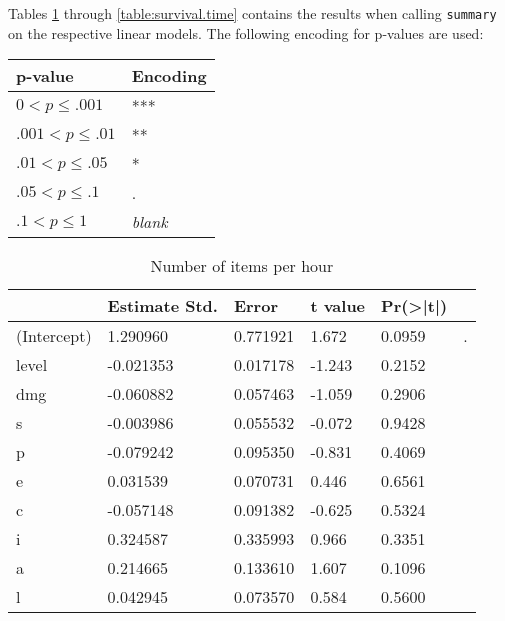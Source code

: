 Tables \ref{table:n.items} through  \ref{table:survival.time} contains the results when calling \texttt{summary} on the respective linear models. The following encoding for p-values are used:

\begin{tabular}{l|l}
\textbf{p-value}&\textbf{Encoding}\\
\hline
$0<p\leq.001$	& ***\\
$.001<p\leq.01$	& **\\
$.01<p\leq.05$	& *\\
$.05<p\leq.1$	& .\\
$.1<p\leq1$		& \textit{blank}\\


\end{tabular}

\begin{table}
\caption{Number of items per hour}
\label{table:n.items}
\begin{tabular}{l|lllll}
&Estimate Std.&Error&t value&Pr(>|t|) &\\ 
\hline
(Intercept)&1.290960 &0.771921 &1.672&0.0959&.\\
level&-0.021353  & 0.017178 & -1.243 &  0.2152&  \\
dmg&-0.060882  & 0.057463 & -1.059 &  0.2906&  \\
s&-0.003986  & 0.055532 & -0.072  & 0.9428&  \\
p&-0.079242 &  0.095350 & -0.831 &  0.4069 & \\
e&0.031539 &  0.070731 &  0.446  & 0.6561&  \\
c& -0.057148  & 0.091382 & -0.625 &  0.5324&  \\
i&0.324587&0.335993&   0.966&   0.3351&  \\
a&0.214665&0.133610 &  1.607&   0.1096&  \\
l&0.042945&0.073570&0.584&0.5600&\\
\hline
\end{tabular}
\end{table}

